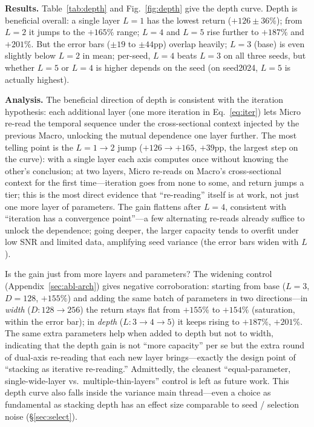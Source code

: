 \documentclass[a4paper,11pt]{article}
\begin{document}
\textbf{Results.} Table~\ref{tab:depth} and Fig.~\ref{fig:depth} give
the depth curve. Depth is beneficial overall: a single layer $L{=}1$ has the
lowest return ($+126\pm36\%$); from $L{=}2$ it jumps to the $+165\%$ range;
$L{=}4$ and $L{=}5$ rise further to $+187\%$ and $+201\%$. But the error bars
($\pm19$ to $\pm44$pp) overlap heavily; $L{=}3$ (base) is even slightly below
$L{=}2$ in mean; per-seed, $L{=}4$ beats $L{=}3$ on all three seeds, but
whether $L{=}5$ or $L{=}4$ is higher depends on the seed (on seed2024, $L{=}5$
is actually highest).

\textbf{Analysis.} The beneficial direction of depth is consistent with
the iteration hypothesis: each additional layer (one more iteration in
Eq.~\eqref{eq:iter}) lets Micro re-read the temporal sequence under the
cross-sectional context injected by the previous Macro, unlocking the mutual
dependence one layer further. The most telling point is the $L{=}1\to2$ jump
($+126\to+165$, $+39$pp, the largest step on the curve): with a single layer
each axis computes once without knowing the other's conclusion; at two layers,
Micro re-reads on Macro's cross-sectional context for the first time---iteration
goes from none to some, and return jumps a tier; this is the most direct
evidence that ``re-reading'' itself is at work, not just one more layer of
parameters. The gain flattens after $L{=}4$, consistent with ``iteration has a
convergence point''---a few alternating re-reads already suffice to unlock the
dependence; going deeper, the larger capacity tends to overfit under low SNR
and limited data, amplifying seed variance (the error bars widen with $L$).

Is the gain just from more layers and parameters? The widening control
(Appendix~\ref{sec:abl-arch}) gives negative corroboration: starting from base
($L{=}3$, $D{=}128$, $+155\%$) and adding the same batch of parameters in two
directions---in \emph{width} ($D{:}128\to256$) the return stays flat from
$+155\%$ to $+154\%$ (saturation, within the error bar); in \emph{depth}
($L{:}3\to4\to5$) it keeps rising to $+187\%$, $+201\%$. The same extra
parameters help when added to depth but not to width, indicating that the
depth gain is not ``more capacity'' per se but the extra round of dual-axis
re-reading that each new layer brings---exactly the design point of ``stacking
as iterative re-reading.'' Admittedly, the cleanest ``equal-parameter,
single-wide-layer vs.\ multiple-thin-layers'' control is left as future work.
This depth curve also falls inside the variance main thread---even a choice as
fundamental as stacking depth has an effect size comparable to seed / selection
noise (\S\ref{sec:select}).
\end{document}
